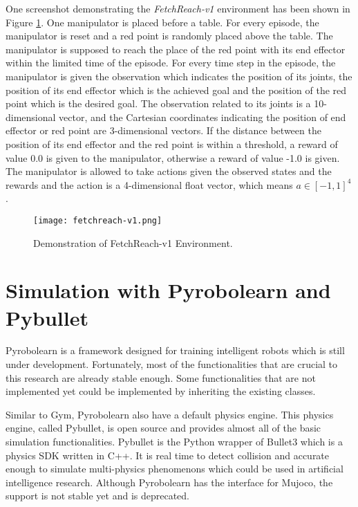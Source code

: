 \documentclass[a4paper, 12pt]{report}
\begin{document}
    One screenshot demonstrating the \emph{FetchReach-v1} environment has been shown in Figure \ref{fetchreach-v1}. One manipulator is placed before a table. For every episode, the manipulator is reset and a red point is randomly placed above the table. The manipulator is supposed to reach the place of the red point with its end effector within the limited time of the episode. For every time step in the episode, the manipulator is given the observation which indicates the position of its joints, the position of its end effector which is the achieved goal and the position of the red point which is the desired goal. The observation related to its joints is a 10-dimensional vector, and the Cartesian coordinates indicating the position of end effector or red point are 3-dimensional vectors. If the distance between the position of its end effector and the red point is within a threshold, a reward of value 0.0 is given to the manipulator, otherwise a reward of value -1.0 is given. The manipulator is allowed to take actions given the observed states and the rewards and the action is a 4-dimensional float vector, which means $a\in [-1,1]^4$.
    \begin{figure}
        \centering
        \texttt{[image: fetchreach-v1.png]}
        \caption{Demonstration of FetchReach-v1 Environment.}
        \label{fetchreach-v1}
    \end{figure}


    \section {Simulation with Pyrobolearn and Pybullet}
    \label{customized_env}

    Pyrobolearn\cite{delhaisse2019pyrobolearn} is a framework designed for training intelligent robots which is still under development. Fortunately, most of the functionalities that are crucial to this research are already stable enough. Some functionalities that are not implemented yet could be implemented by inheriting the existing classes.

    Similar to Gym, Pyrobolearn also have a default physics engine. This physics engine, called Pybullet\cite{coumans2019}, is open source and provides almost all of the basic simulation functionalities. Pybullet is the Python wrapper of Bullet3 which is a physics SDK written in C++. It is real time to detect collision and accurate enough to simulate multi-physics phenomenons which could be used in artificial intelligence research. Although Pyrobolearn has the interface for Mujoco, the support is not stable yet and is deprecated.
\end{document}
